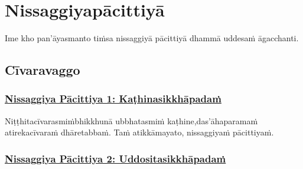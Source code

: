 
\section{Nissaggiyapācittiyā}
\label{np}

\begin{intro}
	Ime kho pan'āyasmanto tiṁsa nissaggiyā pācittiyā dhammā uddesaṁ āgacchanti.
\end{intro}

\setsubsecheadstyle{\subsectionFmt}
\subsection{Cīvaravaggo}

\subsubsection*{\hyperref[forf-exp1]{Nissaggiya Pācittiya 1: Kaṭhinasikkhāpadaṁ}}
\label{np1}

Niṭṭhitacīvarasmiṁ\makeatletter\hyperlink{endnote119-appendix}\makeatother \thinspace bhikkhunā ubbhatasmiṁ kaṭhine,\makeatletter\hyperlink{endnote120-appendix}\makeatother \thinspace das'āhaparamaṁ atirekacīvaraṁ dhāretabbaṁ. Taṁ atikkāmayato, nissaggiyaṁ pācittiyaṁ.



\subsubsection*{\hyperref[forf-exp2]{Nissaggiya Pācittiya 2: Uddositasikkhāpadaṁ}}
\label{np2}

